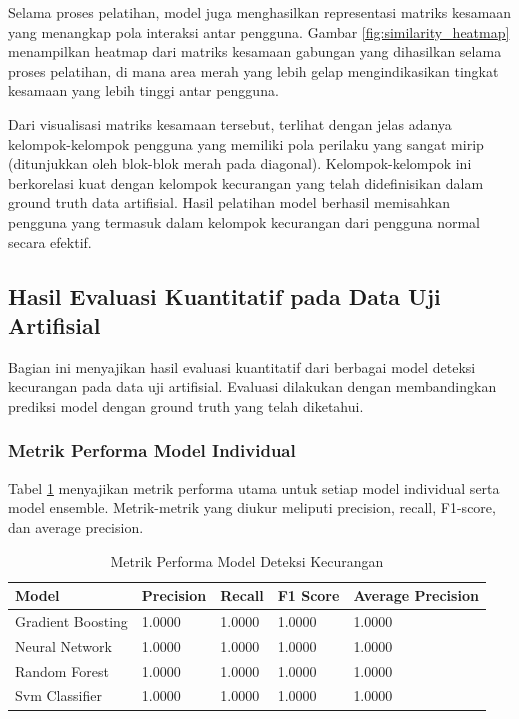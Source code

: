 Selama proses pelatihan, model juga menghasilkan representasi matriks kesamaan yang menangkap pola interaksi antar pengguna. Gambar \ref{fig:similarity_heatmap} menampilkan heatmap dari matriks kesamaan gabungan yang dihasilkan selama proses pelatihan, di mana area merah yang lebih gelap mengindikasikan tingkat kesamaan yang lebih tinggi antar pengguna.


Dari visualisasi matriks kesamaan tersebut, terlihat dengan jelas adanya kelompok-kelompok pengguna yang memiliki pola perilaku yang sangat mirip (ditunjukkan oleh blok-blok merah pada diagonal). Kelompok-kelompok ini berkorelasi kuat dengan kelompok kecurangan yang telah didefinisikan dalam ground truth data artifisial. Hasil pelatihan model berhasil memisahkan pengguna yang termasuk dalam kelompok kecurangan dari pengguna normal secara efektif.

\subsection{Hasil Evaluasi Kuantitatif pada Data Uji Artifisial}
\label{subsec:hasilEvaluasiKuantitatif}

Bagian ini menyajikan hasil evaluasi kuantitatif dari berbagai model deteksi kecurangan pada data uji artifisial. Evaluasi dilakukan dengan membandingkan prediksi model dengan ground truth yang telah diketahui.

\subsubsection{Metrik Performa Model Individual}

Tabel \ref{tabel:performanceModels} menyajikan metrik performa utama untuk setiap model individual serta model ensemble. Metrik-metrik yang diukur meliputi precision, recall, F1-score, dan average precision.

\begin{table}[htbp]
\centering
\caption{Metrik Performa Model Deteksi Kecurangan}
\label{tabel:performanceModels}
\begin{tabular}{lllll}
\toprule
Model & Precision & Recall & F1 Score & Average Precision \\
\midrule
Gradient Boosting & 1.0000 & 1.0000 & 1.0000 & 1.0000 \\
Neural Network & 1.0000 & 1.0000 & 1.0000 & 1.0000 \\
Random Forest & 1.0000 & 1.0000 & 1.0000 & 1.0000 \\
Svm Classifier & 1.0000 & 1.0000 & 1.0000 & 1.0000 \\
\bottomrule
\end{tabular}
\end{table}

